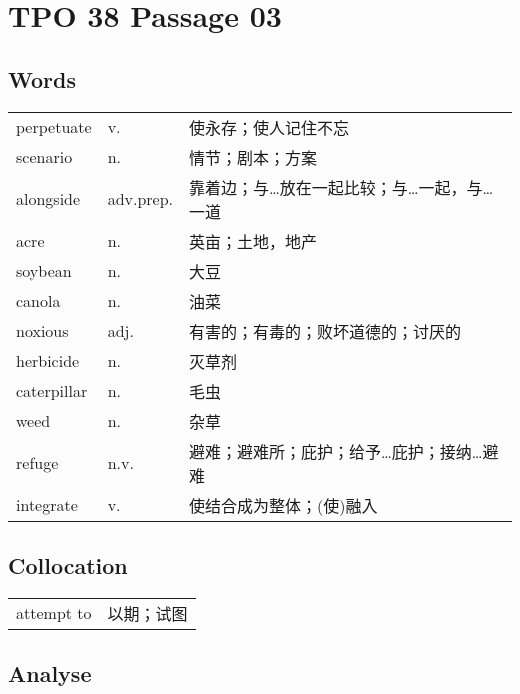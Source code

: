 \section{TPO 38 Passage 03}

\subsection{Words}

\begin{tabular}{lll}
    perpetuate  & v.        & 使永存；使人记住不忘             \\
    scenario    & n.        & 情节；剧本；方案               \\
    alongside   & adv.prep. & 靠着边；与…放在一起比较；与…一起，与…一道 \\
    acre        & n.        & 英亩；土地，地产               \\
    soybean     & n.        & 大豆                     \\
    canola      & n.        & 油菜                     \\
    noxious     & adj.      & 有害的；有毒的；败坏道德的；讨厌的      \\
    herbicide   & n.        & 灭草剂                    \\
    caterpillar & n.        & 毛虫                     \\
    weed        & n.        & 杂草                     \\
    refuge      & n.v.      & 避难；避难所；庇护；给予…庇护；接纳…避难  \\
    integrate   & v.        & 使结合成为整体；(使)融入          \\
\end{tabular}

\subsection{Collocation}

\begin{tabular}{ll}
    attempt to & 以期；试图 \\
\end{tabular}

\subsection{Analyse}

